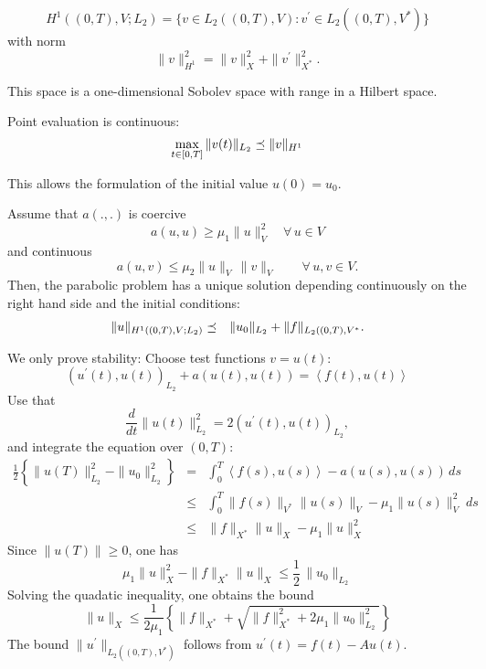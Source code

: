 \begin{definition} 
$$
H^1 ((0,T),V;L_2) = \{ v \in L_2((0,T),V) : v^\prime \in L_2((0,T),V^\ast) \}
$$
with norm
$$
\| v \|_{H^1}^2 = \| v \|_X^2 + \| v^\prime \|_{X^\ast}^2.
$$
\end{definition}

This space is a one-dimensional Sobolev space with range in a Hilbert space.

\begin{theorem}
Point evaluation is continuous:
$$
\max_{t \in [0,T]} \| v(t) \|_{L_2} \preceq \| v\|_{H^1}
$$
\end{theorem}
This allows the formulation of the initial value $u(0) = u_0$.

\begin{theorem} Assume that $a(.,.)$ is 
coercive
$$
a(u,u) \geq \mu_1 \| u \|_V^2 \quad \forall \, u \in V
$$
and continuous
$$
a(u,v) \leq \mu_2 \|u \|_V \, \| v\|_V \qquad \forall \, u,v \in V.
$$ 
Then, the parabolic problem has a unique solution depending continuously on the 
right hand side and the initial conditions:
\begin{eqnarray*}
 \| u \|_{H^1((0,T),V; L_2)} & \preceq & \| u_0 \|_{L_2} + \| f \|_{L_2((0,T),V^\ast}.
\end{eqnarray*}
\end{theorem}
We only prove stability: Choose test functions $v = u(t)$:
$$
(u^\prime(t), u(t))_{L_2} + a(u(t), u(t)) = \left< f(t), u(t) \right>
$$
Use that
$$
\frac{d}{dt} \| u(t) \|_{L_2}^2 = 2 (u^\prime(t), u(t))_{L_2},
$$
and integrate the equation over $(0,T)$:
\begin{eqnarray*}
\frac{1}{2} \left\{ \| u(T) \|_{L_2}^2 - \| u_0 \|_{L_2}^2 \right\}
& = & \int_0^T \left< f(s), u(s) \right> - a(u(s), u(s)) \, ds \\
& \leq &  \int_0^T \| f(s) \|_{V^\ast} \| u(s) \|_V - \mu_1 \| u(s) \|_V^2 \; ds \\
& \leq & \| f \|_{X^\ast} \| u \|_X - \mu_1 \| u \|_X^2
\end{eqnarray*}
Since $\| u(T) \| \geq 0$, one has
$$
\mu_1 \| u \|_X^2 - \| f \|_{X^\ast} \| u \|_X \leq \frac{1}{2} \, \| u_0 \|_{L_2}
$$
Solving the quadatic inequality, one obtains the bound
$$
\| u \|_X \leq \frac{1}{2\mu_1} \left\{ \| f \|_{X^\ast} + \sqrt{\| f \|_{X^\ast}^2 + 2 \mu_1 \| u_0 \|_{L_2}^2} \right\}
$$
The bound $\| u^\prime \|_{L_2((0,T),V^\ast)}$ follows from $u^\prime(t) = f(t) - A u(t)$.

